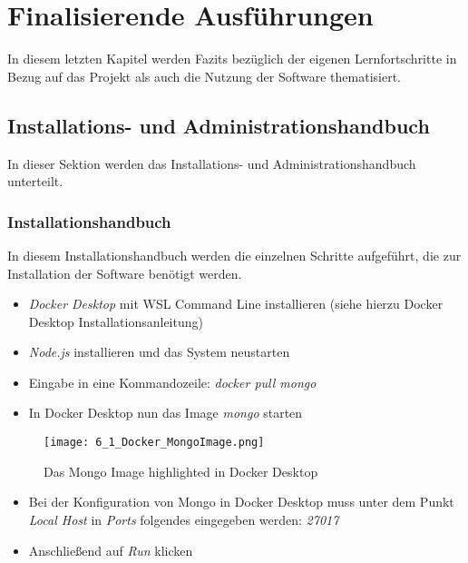 \chapter{Finalisierende Ausführungen}

In diesem letzten Kapitel werden Fazits bezüglich der eigenen Lernfortschritte in Bezug auf das Projekt als auch die Nutzung der Software thematisiert.

\section{Installations- und Administrationshandbuch}

In dieser Sektion werden das Installations- und Administrationshandbuch unterteilt.

\subsection{Installationshandbuch}

In diesem Installationshandbuch werden die einzelnen Schritte aufgeführt, die zur Installation der Software benötigt werden.

\begin{itemize}
    \item   \textit{Docker Desktop} mit WSL Command Line installieren (siehe hierzu Docker Desktop Installationsanleitung)
    \item   \textit{Node.js} installieren und das System neustarten
    \item   Eingabe in eine Kommandozeile: \textit{docker pull mongo}
    \item   In Docker Desktop nun das Image \textit{mongo} starten
\end{itemize}

\begin{figure}[!h]
    \centering
    \texttt{[image: 6\_1\_Docker\_MongoImage.png]}
    \caption{Das Mongo Image highlighted in Docker Desktop}
    \label{fig:DockerMongoImage}
\end{figure}

\begin{itemize}
    \item   Bei der Konfiguration von Mongo in Docker Desktop muss unter dem Punkt \textit{Local Host} in \textit{Ports} folgendes eingegeben werden: \textit{27017}
    \item   Anschließend auf \textit{Run} klicken 
\end{itemize}

